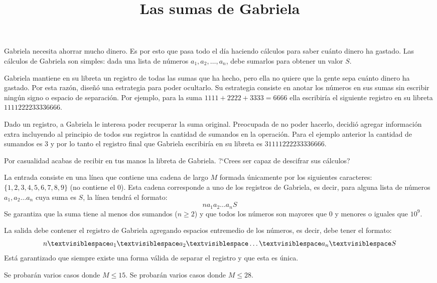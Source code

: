 \documentclass{oci}
\title{Las sumas de Gabriela}
\begin{document}
\begin{problemDescription}
Gabriela necesita ahorrar mucho dinero.
Es por esto que pasa todo el día haciendo cálculos para saber cuánto dinero
ha gastado.
Las cálculos de Gabriela son simples: dada una lista de números $a_1, a_2,
\dots, a_n$, debe sumarlos para obtener un valor $S$.

Gabriela mantiene en su libreta un registro de todas las sumas que ha hecho,
pero ella no quiere que la gente sepa cuánto dinero ha gastado.
Por esta razón, diseñó una estrategia para poder ocultarlo.
Su estrategia consiste en anotar los números en sus sumas sin escribir
ningún signo o espacio de separación.
Por ejemplo, para la suma $1111+2222+3333=6666$ ella escribiría el siguiente
registro en su libreta $1111222233336666$.

Dado un registro, a Gabriela le interesa poder recuperar la suma original.
Preocupada de no poder hacerlo, decidió agregar información extra incluyendo al
principio de todos sus registros la cantidad de sumandos en la operación.
Para el ejemplo anterior la cantidad de sumandos es $3$ y por lo tanto el
registro final que Gabriela escribiría en su libreta es $31111222233336666$.

Por casualidad acabas de recibir en tus manos la libreta de Gabriela.
?`Crees ser capaz de descifrar sus cálculos?
\end{problemDescription}

\begin{inputDescription}
La entrada consiste en una línea que contiene una cadena de largo $M$ formada
únicamente por los siguientes caracteres: $\{1,2,3,4,5,6,7,8,9\}$ (no contiene el
$0$).
Esta cadena corresponde a uno de los registros de Gabriela, es decir, para
alguna lista de números $a_1,a_2\dots a_n$ cuya suma es $S$, la línea tendrá el
formato:
$$n a_1 a_2 \dots a_nS$$
Se garantiza que la suma tiene al menos dos sumandos ($n\geq 2$) y que todos los
números son mayores que 0 y menores o iguales que $10^9$.
\end{inputDescription}

\begin{outputDescription}
La salida debe contener el registro de Gabriela agregando espacios 
entremedio de los números, es decir, debe tener el formato:
$$n\textvisiblespace a_1\textvisiblespace a_2\textvisiblespace
\dots\textvisiblespace a_n\textvisiblespace S$$
Está garantizado que siempre existe una forma válida de separar el registro y que
esta es única.
\end{outputDescription}

\begin{scoreDescription}
   Se probarán varios casos donde $M\leq 15$.
   Se probarán varios casos donde $M\leq 28$.
\end{scoreDescription}

\begin{sampleDescription}
\end{sampleDescription}
\end{document}
